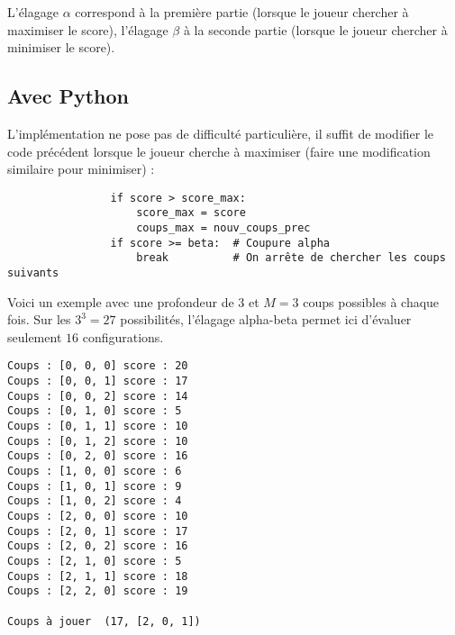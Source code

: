 \documentclass[11pt,class=report,crop=false]{standalone}
\begin{document}
L'élagage $\alpha$ correspond à la première partie (lorsque le joueur chercher à maximiser le score), l'élagage $\beta$ à la seconde partie (lorsque le joueur chercher à minimiser le score).
	
	
\subsection{Avec Python}

L'implémentation ne pose pas de difficulté particulière, il suffit de modifier le code précédent lorsque le joueur cherche à maximiser (faire une modification similaire pour minimiser) :
\begin{lstlisting}
				if score > score_max:
					score_max = score
					coups_max = nouv_coups_prec
				if score >= beta:  # Coupure alpha
					break          # On arrête de chercher les coups suivants
\end{lstlisting}


%

Voici un exemple avec une profondeur de $3$ et $M=3$ coups possibles à chaque fois.
Sur les $3^3 = 27$ possibilités, l'élagage alpha-beta permet ici d'évaluer seulement $16$ configurations.



\begin{lstlisting}
Coups : [0, 0, 0] score : 20 
Coups : [0, 0, 1] score : 17 
Coups : [0, 0, 2] score : 14
Coups : [0, 1, 0] score : 5
Coups : [0, 1, 1] score : 10 
Coups : [0, 1, 2] score : 10 
Coups : [0, 2, 0] score : 16
Coups : [1, 0, 0] score : 6 
Coups : [1, 0, 1] score : 9
Coups : [1, 0, 2] score : 4
Coups : [2, 0, 0] score : 10 
Coups : [2, 0, 1] score : 17 
Coups : [2, 0, 2] score : 16
Coups : [2, 1, 0] score : 5 
Coups : [2, 1, 1] score : 18
Coups : [2, 2, 0] score : 19

Coups à jouer  (17, [2, 0, 1])	
\end{lstlisting}


\end{document}
